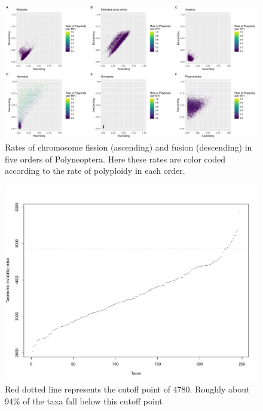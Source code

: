 \newpage
\begin{figure}[h]
\centering \includegraphics[width=1\textwidth]{figures/rate_distributions_fixed_scale.pdf}
\caption{
Rates of chromosome fission (ascending) and fusion (descending) in five orders of Polyneoptera. Here these rates are color coded according to the rate of polyploidy in each order. 
}
\label{fig:rates}
\end{figure}

\newpage
\begin{figure}[ht]
\centering \includegraphics[width=.5\textwidth]{figures/taxonomic_instability_index_plot.pdf}
\caption{
Red dotted line represents the cutoff point of 4780. Roughly about 94\% of the taxa fall below this cutoff point
}
\label{fig:tax.index}
\end{figure}

